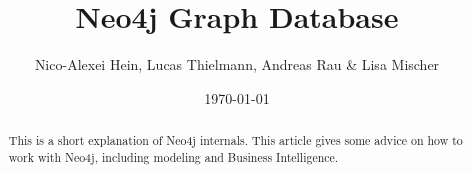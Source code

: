 \documentclass[
	onesided,
	12pt
]{article}
\title{Neo4j Graph Database}
\author{
	Nico-Alexei Hein, Lucas Thielmann, Andreas Rau \& Lisa Mischer
}
\date{\today}
\begin{document}
\maketitle


\begin{abstract}
This is a short explanation of Neo4j internals. This article gives some advice on how to work with Neo4j, including modeling and Business Intelligence.
\end{abstract}

\newpage


\newpage

\newpage

\newpage


\newpage
\printbibliography
\end{document}
